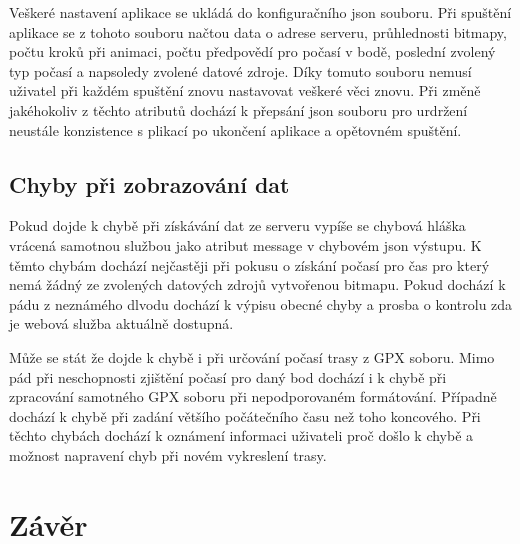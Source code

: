 \documentclass[czech,bachelor,dept460,male,csharp,cpdeclaration]{diploma}
\begin{document}
	Veškeré nastavení aplikace se ukládá do konfiguračního json souboru. Při spuštění aplikace se z tohoto souboru načtou data o adrese serveru, průhlednosti bitmapy, počtu kroků při animaci, počtu předpovědí pro počasí v bodě, poslední zvolený typ počasí a napsoledy zvolené datové zdroje. Díky tomuto souboru nemusí uživatel při každém spuštění znovu nastavovat veškeré věci znovu. Při změně jakéhokoliv z těchto atributů dochází k přepsání json souboru pro urdržení neustále konzistence s plikací po ukončení aplikace a opětovném spuštění.
	
	\section{Chyby při zobrazování dat}
	
	Pokud dojde k chybě při získávání dat ze serveru vypíše se chybová hláška vrácená samotnou službou jako atribut message v chybovém json výstupu. K těmto chybám dochází nejčastěji při pokusu o získání počasí pro čas pro který nemá žádný ze zvolených datových zdrojů vytvořenou bitmapu. Pokud dochází k pádu z neznámého dlvodu dochází k výpisu obecné chyby a prosba o kontrolu zda je webová služba aktuálně dostupná.
	
	Může se stát že dojde k chybě i při určování počasí trasy z GPX soboru. Mimo pád při neschopnosti zjištění počasí pro daný bod dochází i k chybě při zpracování samotného GPX soboru při nepodporovaném formátování. Případně dochází k chybě při zadání většího počátečního času než toho koncového. Při těchto chybách dochází k oznámení informaci uživateli proč došlo k chybě a možnost napravení chyb při novém vykreslení trasy.
	
	\chapter{Závěr}
	
	\printbibliography[title={Literatura}, heading=bibintoc]

	
\end{document}
